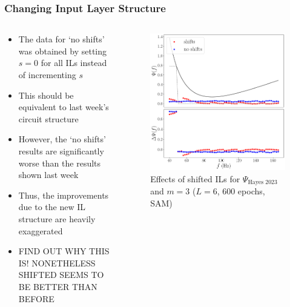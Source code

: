 \documentclass{beamer}
\begin{document}
\begin{frame}
\frametitle{Changing Input Layer Structure}
\begin{columns}
\begin{column}{0.5\textwidth}
\begin{itemize}
\item The data for `no shifts' was obtained by setting  $s=0$ for all ILs instead of incrementing $s$
\item This should be equivalent to last week's circuit structure 
\item However, the `no shifts' results are significantly worse than the results shown last week
\item Thus, the improvements due to the new IL structure are heavily exaggerated  
\item FIND OUT WHY THIS IS! NONETHELESS SHIFTED SEEMS TO BE BETTER THAN BEFORE
\end{itemize}
\end{column}
\begin{column}{0.5\textwidth}
\begin{figure}
\centering 
\includegraphics[width=\textwidth]{im/phase_shift_comp_psi_m3}
\caption{Effects of shifted ILs for $\Psi_\text{Hayes 2023}$ and $m=3$ ($L=6$, 600 epochs, SAM)}
\end{figure}
\end{column}
\end{columns}
\end{frame}
\end{document}

